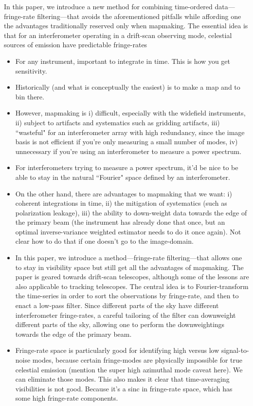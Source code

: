 \documentclass[twocolumn,apj,numberedappendix]{emulateapj}
\begin{document}
In this paper, we introduce a new method for combining time-ordered data---fringe-rate filtering---that avoids the aforementioned pitfalls while affording one the advantages traditionally reserved only when mapmaking.  The essential idea is that for an interferometer operating in a drift-scan observing mode, celestial sources of emission have predictable fringe-rates 

\begin{itemize}
\item For any instrument, important to integrate in time.  This is how you get sensitivity.
\item Historically (and what is conceptually the easiest) is to make a map and to bin there.
\item However, mapmaking is i) difficult, especially with the widefield instruments, ii) subject to artifacts and systematics such as gridding artifacts, iii) ``wasteful" for an interferometer array with high redundancy, since the image basis is not efficient if you're only measuring a small number of modes, iv) unnecessary if you're using an interferometer to measure a power spectrum.
\item For interferometers trying to measure a power spectrum, it'd be nice to be able to stay in the natural ``Fourier" space defined by an interferometer.
\item On the other hand, there are advantages to mapmaking that we want: i) coherent integrations in time, ii) the mitigation of systematics (such as polarization leakage), iii) the ability to down-weight data towards the edge of the primary beam (the instrument has already done that once, but an optimal inverse-variance weighted estimator needs to do it once again).  Not clear how to do that if one doesn't go to the image-domain.
\item In this paper, we introduce a method---fringe-rate filtering---that allows one to stay in visibility space but still get all the advantages of mapmaking.  The paper is geared towards drift-scan telescopes, although some of the lessons are also applicable to tracking telescopes.  The central idea is to Fourier-transform the time-series in order to sort the observations by fringe-rate, and then to enact a low-pass filter.  Since different parts of the sky have different interferometer fringe-rates, a careful tailoring of the filter can downweight different parts of the sky, allowing one to perform the downweightings towards the edge of the primary beam.
\item Fringe-rate space is particularly good for identifying high versus low signal-to-noise modes, because certain fringe-modes are physically impossible for true celestial emission (mention the super high azimuthal mode caveat here).  We can eliminate those modes.  This also makes it clear that time-averaging visibilities is not good.  Because it's a sinc in fringe-rate space, which has some high fringe-rate components.


\end{itemize}
\end{document}
